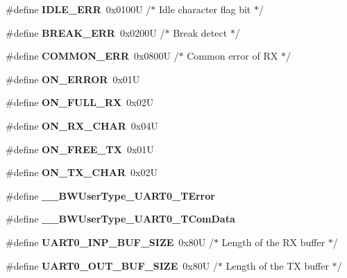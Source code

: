 \begin{DoxyCompactItemize}
\#define {\bfseries I\+D\+L\+E\+\_\+\+E\+RR}~0x0100\+U       /$\ast$ Idle character flag bit   $\ast$/
\item 
\mbox{\label{group___u_a_r_t0__module_ga0cb4d61ee3347eb62142ca0eb1d02a53}} 
\#define {\bfseries B\+R\+E\+A\+K\+\_\+\+E\+RR}~0x0200\+U       /$\ast$ Break detect              $\ast$/
\item 
\mbox{\label{group___u_a_r_t0__module_ga86e7d2a6a6227d9fbb84d459454c2359}} 
\#define {\bfseries C\+O\+M\+M\+O\+N\+\_\+\+E\+RR}~0x0800\+U       /$\ast$ Common error of R\+X       $\ast$/
\item 
\mbox{\label{group___u_a_r_t0__module_gab5034f048fef6a41e7901a4e34368f3d}} 
\#define {\bfseries O\+N\+\_\+\+E\+R\+R\+OR}~0x01U
\item 
\mbox{\label{group___u_a_r_t0__module_ga2cf6b6a2b8c83f7d1d7e6134c6bd9a4a}} 
\#define {\bfseries O\+N\+\_\+\+F\+U\+L\+L\+\_\+\+RX}~0x02U
\item 
\mbox{\label{group___u_a_r_t0__module_gad07f43952e300ba1e45521ce777c09d4}} 
\#define {\bfseries O\+N\+\_\+\+R\+X\+\_\+\+C\+H\+AR}~0x04U
\item 
\mbox{\label{group___u_a_r_t0__module_ga71d35387335972e4f6ae07ecccf27724}} 
\#define {\bfseries O\+N\+\_\+\+F\+R\+E\+E\+\_\+\+TX}~0x01U
\item 
\mbox{\label{group___u_a_r_t0__module_gaf02aa8bfc7e9b5338168db9ff9077c0d}} 
\#define {\bfseries O\+N\+\_\+\+T\+X\+\_\+\+C\+H\+AR}~0x02U
\item 
\mbox{\label{group___u_a_r_t0__module_ga2ca35c63c880304e7347182661c2074a}} 
\#define {\bfseries \+\_\+\+\_\+\+B\+W\+User\+Type\+\_\+\+U\+A\+R\+T0\+\_\+\+T\+Error}
\item 
\mbox{\label{group___u_a_r_t0__module_ga46a8d5dff9b12e5b7a339db739b1d491}} 
\#define {\bfseries \+\_\+\+\_\+\+B\+W\+User\+Type\+\_\+\+U\+A\+R\+T0\+\_\+\+T\+Com\+Data}
\item 
\mbox{\label{group___u_a_r_t0__module_gaac3aed60c8c634bab624b2d2ccd23ed1}} 
\#define {\bfseries U\+A\+R\+T0\+\_\+\+I\+N\+P\+\_\+\+B\+U\+F\+\_\+\+S\+I\+ZE}~0x80\+U      /$\ast$ Length of the R\+X buffer $\ast$/
\item 
\mbox{\label{group___u_a_r_t0__module_gaae233ec4fe05df6f834a4c2a40d85438}} 
\#define {\bfseries U\+A\+R\+T0\+\_\+\+O\+U\+T\+\_\+\+B\+U\+F\+\_\+\+S\+I\+ZE}~0x80\+U      /$\ast$ Length of the T\+X buffer $\ast$/
\end{DoxyCompactItemize}
